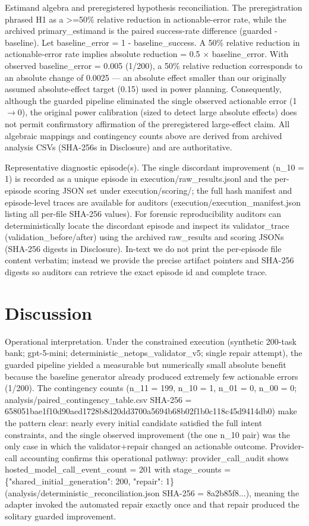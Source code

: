 \documentclass[conference]{IEEEtran}
\begin{document}
Estimand algebra and preregistered hypothesis reconciliation. The preregistration phrased H1 as a >=50\% relative reduction in actionable-error rate, while the archived primary\_estimand is the paired success-rate difference (guarded - baseline). Let baseline\_error = 1 - baseline\_success. A 50\% relative reduction in actionable-error rate implies absolute reduction = 0.5 \ensuremath{\times} baseline\_error. With observed baseline\_error = 0.005 (1/200), a 50\% relative reduction corresponds to an absolute change of 0.0025 --- an absolute effect smaller than our originally assumed absolute-effect target (0.15) used in power planning. Consequently, although the guarded pipeline eliminated the single observed actionable error (1\ensuremath{\rightarrow}0), the original power calibration (sized to detect large absolute effects) does not permit confirmatory affirmation of the preregistered large-effect claim. All algebraic mappings and contingency counts above are derived from archived analysis CSVs (SHA-256s in Disclosure) and are authoritative.

Representative diagnostic episode(s). The single discordant improvement (n\_10 = 1) is recorded as a unique episode in execution/raw\_results.jsonl and the per-episode scoring JSON set under execution/scoring/; the full hash manifest and episode-level traces are available for auditors (execution/execution\_manifest.json listing all per-file SHA-256 values). For forensic reproducibility auditors can deterministically locate the discordant episode and inspect its validator\_trace (validation\_before/after) using the archived raw\_results and scoring JSONs (SHA-256 digests in Disclosure). In-text we do not print the per-episode file content verbatim; instead we provide the precise artifact pointers and SHA-256 digests so auditors can retrieve the exact episode id and complete trace.

\section{Discussion}
Operational interpretation. Under the constrained execution (synthetic 200-task bank; gpt-5-mini; deterministic\_netops\_validator\_v5; single repair attempt), the guarded pipeline yielded a measurable but numerically small absolute benefit because the baseline generator already produced extremely few actionable errors (1/200). The contingency counts (n\_11 = 199, n\_10 = 1, n\_01 = 0, n\_00 = 0; analysis/paired\_contingency\_table.csv SHA-256 = 658051bae1f10d90aed1728b8d20dd3700a5694b68b02f1b0c118c45d9414db0) make the pattern clear: nearly every initial candidate satisfied the full intent constraints, and the single observed improvement (the one n\_10 pair) was the only case in which the validator+repair changed an actionable outcome. Provider-call accounting confirms this operational pathway: provider\_call\_audit shows hosted\_model\_call\_event\_count = 201 with stage\_counts = \{"shared\_initial\_generation": 200, "repair": 1\} (analysis/deterministic\_reconciliation.json SHA-256 = 8a2b85f8...), meaning the adapter invoked the automated repair exactly once and that repair produced the solitary guarded improvement.
\end{document}
